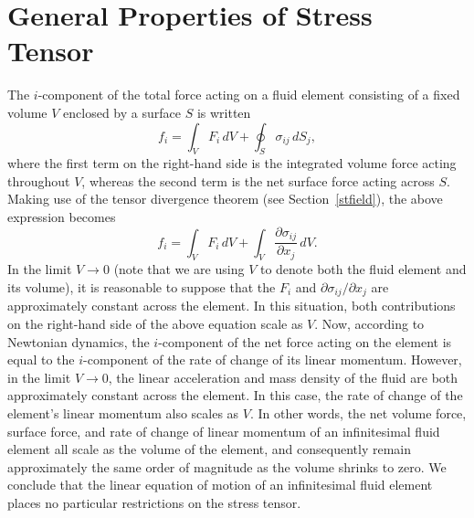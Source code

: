\section{General Properties of  Stress Tensor}\label{s4.3}
 The $i$-component of the total force acting on a  fluid element consisting of a fixed volume $V$ enclosed by a surface $S$ is written
 \begin{equation}
 f_i = \int_V F_i\,dV + \oint_S \sigma_{ij}\,dS_j,
 \end{equation}
 where the first term on the right-hand side is the integrated volume force acting throughout $V$, whereas the
 second term is the net surface force acting across $S$. Making use of the tensor divergence theorem (see Section~\ref{stfield}),
 the above expression becomes
 \begin{equation}
 f_i = \int_V F_i\,dV + \int_V \frac{\partial \sigma_{ij}}{\partial x_j}\,dV.
 \end{equation}
In the limit   $V\rightarrow 0$ (note that we are using $V$ to denote both the fluid element and its volume), it is reasonable to suppose that the $F_i$ and $\partial \sigma_{ij}/\partial x_j$ are
 approximately constant across the element. In this situation, both contributions on the right-hand side of the above equation scale as $V$. Now, according to Newtonian dynamics, 
 the $i$-component of the net force acting on the element is equal to the $i$-component of the rate of change of its linear  momentum. However, in the limit
  $V\rightarrow 0$,  the  linear acceleration and mass density of the fluid are  both approximately constant across the element. In this case,
  the 
  rate of change of the  element's linear momentum
 also scales as  $V$. In other words,  the net volume force, surface force, and
 rate of change of linear momentum of an infinitesimal fluid element  all scale as the volume of the element, and
 consequently remain  approximately the same order of magnitude as the volume shrinks to zero. We conclude
 that
 the linear equation of motion of an infinitesimal fluid element places no particular restrictions on the stress tensor. 
 
